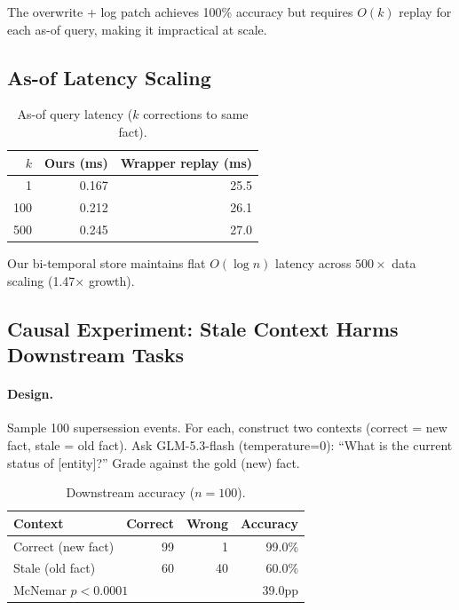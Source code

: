 \documentclass{article}
\begin{document}
The overwrite + log patch achieves 100\% accuracy but requires $O(k)$ replay for each as-of query, making it impractical at scale.

\subsection{As-of Latency Scaling}

\begin{table}[h]
\centering
\caption{As-of query latency ($k$ corrections to same fact).}
\begin{tabular}{rrr}
\toprule
$k$ & Ours (ms) & Wrapper replay (ms) \\
\midrule
1 & 0.167 & 25.5 \\
100 & 0.212 & 26.1 \\
500 & 0.245 & 27.0 \\
\bottomrule
\end{tabular}
\label{tab:latency}
\end{table}

Our bi-temporal store maintains flat $O(\log n)$ latency across $500\times$ data scaling (1.47$\times$ growth).

\subsection{Causal Experiment: Stale Context Harms Downstream Tasks}
\label{sec:causal}

\paragraph{Design.} Sample 100 supersession events. For each, construct two contexts (correct = new fact, stale = old fact). Ask GLM-5.3-flash (temperature=0): ``What is the current status of [entity]?'' Grade against the gold (new) fact.

\begin{table}[h]
\centering
\caption{Downstream accuracy ($n{=}100$).}
\begin{tabular}{lrrr}
\toprule
Context & Correct & Wrong & Accuracy \\
\midrule
Correct (new fact) & 99 & 1 & 99.0\% \\
Stale (old fact) & 60 & 40 & 60.0\% \\
\midrule
\multicolumn{3}{l}{McNemar $p < 0.0001$} & \multicolumn{1}{r}{39.0pp} \\
\bottomrule
\end{tabular}
\label{tab:causal}
\end{table}
\end{document}
